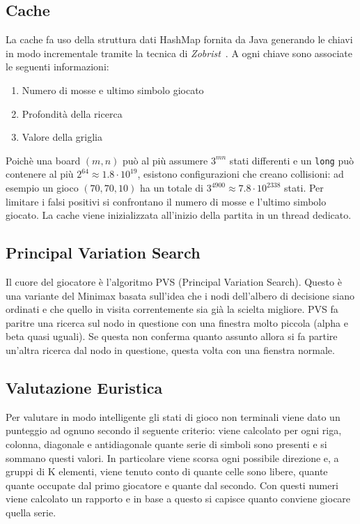 \documentclass{article}
\begin{document}
\subsection{Cache}
La cache fa uso della struttura dati HashMap fornita da Java generando le chiavi 
in modo incrementale tramite la tecnica di \emph{Zobrist}~\cite{zobrist}. A ogni
chiave sono associate le seguenti informazioni:
\begin{enumerate}
  \item Numero di mosse e ultimo simbolo giocato
  \item Profondit\`a della ricerca
  \item Valore della griglia
\end{enumerate}
Poich\`e una board $(m,n)$ pu\`o al pi\`u assumere $3^{mn}$ stati differenti e
un \verb!long! pu\`o contenere al pi\`u $2^{64} \approx 1.8 \cdot 10^{19}$,
esistono configurazioni che creano collisioni: ad esempio un gioco $(70, 70, 10)$
ha un totale di $3^{4900} \approx 7.8 \cdot 10^{2338}$ stati. Per limitare i
falsi positivi si confrontano il numero di mosse e l'ultimo simbolo giocato.
La cache viene inizializzata all'inizio della partita in un thread dedicato.


\subsection{Principal Variation Search}
Il cuore del giocatore è l'algoritmo PVS (Principal Variation Search). Questo è 
una variante del Minimax basata sull'idea che i nodi dell'albero di decisione 
siano ordinati e che quello in visita correntemente sia gi\`a la scielta migliore.
PVS fa paritre una ricerca sul nodo in questione con una finestra molto piccola 
(alpha e beta quasi uguali). Se questa non conferma quanto assunto allora si fa
partire un'altra ricerca dal nodo in questione, questa volta con una fienstra 
normale.

\subsection{Valutazione Euristica}
Per valutare in modo intelligente gli stati di gioco non terminali viene dato un 
punteggio ad ognuno secondo il seguente criterio: viene calcolato per
ogni riga, colonna, diagonale e antidiagonale quante serie di simboli sono presenti
e si sommano questi valori. In particolare viene scorsa ogni possibile direzione e,
a gruppi di K elementi, viene tenuto conto di quante celle sono libere, quante
quante occupate dal primo giocatore e quante dal secondo. Con questi numeri viene 
calcolato un rapporto e in base a questo si capisce quanto conviene giocare 
quella serie.

\pagebreak


\end{document}
